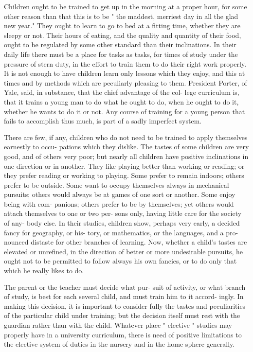 \documentclass[
]{book}
\begin{document}
Children ought to be trained to get up in the morning at a proper hour, for some other reason than that this is to be " the maddest, merriest day in all the glad new year." They ought to learn to go to bed at a fitting time, whether they are sleepy or not. Their hours of eating, and the quality and quantity of their food, ought to be regulated by some other standard than their inclinations. In their daily life there must be a place for tasks as tasks, for times of study under the pressure of stern duty, in the effort to train them to do their right work properly. It is not enough to have children learn only lessons which they enjoy, and this at times and by methods which are peculiarly pleasing to them. President Porter, of Yale, said, in substance, that the chief advantage of the col- lege curriculum is, that it trains a young man to do what he ought to do, when he ought to do it, whether he wants to do it or not. Any course of training for a young person that fails to accomplish thus much, is part of a sadly imperfect system.

There are few, if any, children who do not need to be trained to apply themselves earnestly to occu- pations which they dislike. The tastes of some children are very good, and of others very poor; but nearly all children have positive inclinations in one direction or in another. They like playing better than working or reading; or they prefer reading or working to playing. Some prefer to remain indoors; others prefer to be outside. Some want to occupy themselves always in mechanical pursuits; others would always be at games of one sort or another. Some enjoy being with com- panions; others prefer to be by themselves; yet others would attach themselves to one or two per- sons only, having little care for the society of any- body else. In their studies, children show, perhaps very early, a decided fancy for geography, or his- tory, or mathematics, or the languages, and a pro- nounced distaste for other branches of learning. Now, whether a child's tastes are elevated or unrefined, in the direction of better or more undesirable pursuits, he ought not to be permitted to follow always his own fancies, or to do only that which he really likes to do.

The parent or the teacher must decide what pur- suit of activity, or what branch of study, is best for each several child, and must train him to it accord- ingly. In making this decision, it is important to consider fully the tastes and peculiarities of the particular child under training; but the decision itself must rest with the guardian rather than with the child. Whatever place " elective " studies may properly have in a university curriculum, there is need of positive limitations to the elective system of duties in the nursery and in the home sphere generally.
\end{document}
